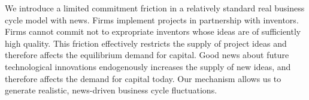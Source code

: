 \documentclass[12pt]{article}
\begin{document}
We introduce a limited commitment friction in a relatively standard real business cycle model with news. Firms implement projects in partnership with inventors. Firms cannot commit not to expropriate inventors whose ideas are of sufficiently high quality. This friction effectively restricts the supply of  project ideas and therefore affects the equilibrium demand for capital. Good news about future technological innovations endogenously increases the supply of new ideas, and therefore affects the demand for capital today. Our mechanism allows us to generate realistic, news-driven business cycle fluctuations.

\newpage

\singlespace



\newpage

\small









\newpage
\doublespace
\begin{small}

\newpage


\end{small}
%
\end{document}
